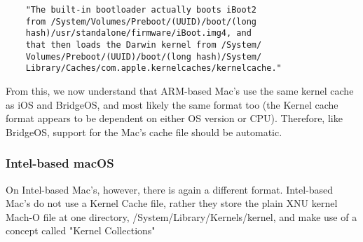 \begin{verbatim}
	"The built-in bootloader actually boots iBoot2 
	from /System/Volumes/Preboot/(UUID)/boot/(long 
	hash)/usr/standalone/firmware/iBoot.img4, and 
	that then loads the Darwin kernel from /System/
	Volumes/Preboot/(UUID)/boot/(long hash)/System/
	Library/Caches/com.apple.kernelcaches/kernelcache."
\end{verbatim}

From this, we now understand that ARM-based Mac's use the same kernel cache as iOS and BridgeOS, and most likely the same format too (the Kernel cache format appears to be dependent on either OS version or CPU). Therefore, like BridgeOS, support for the Mac's cache file should be automatic. 


\subsubsection{Intel-based macOS}

On Intel-based Mac's, however, there is again a different format. Intel-based Mac's do not use a Kernel Cache file, rather they store the plain XNU kernel Mach-O file at one directory, /System/Library/Kernels/kernel, and make use of a concept called "Kernel Collections"







